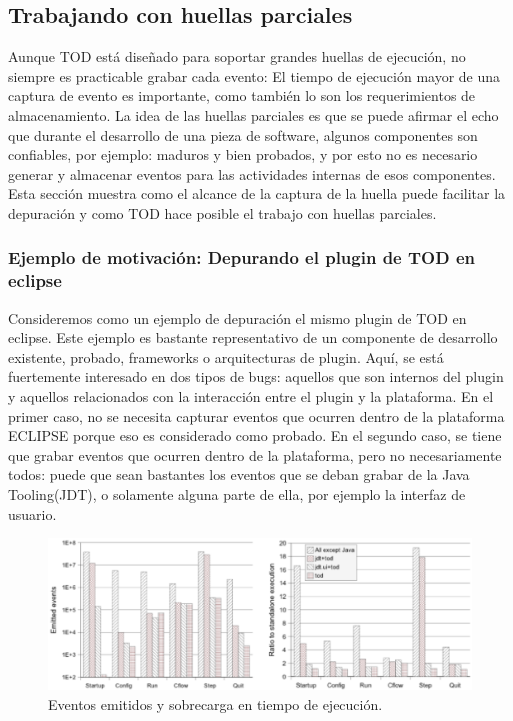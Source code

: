 \documentclass[12pt,legalpaper]{report}
\begin{document}
		\subsection{Trabajando con huellas parciales}

	Aunque TOD está diseñado para soportar grandes huellas de ejecución, no siempre es practicable grabar cada evento:  El tiempo de ejecución mayor de una captura de evento es importante, como también lo son los requerimientos de almacenamiento.  La idea de las huellas parciales es que se puede afirmar el echo que durante el desarrollo de una pieza de software, algunos componentes son confiables, por ejemplo: maduros y bien probados, y por esto no es necesario generar y almacenar eventos para las actividades internas de esos componentes.  Esta sección muestra como el alcance de la captura de la huella puede facilitar la depuración y como TOD hace posible el trabajo con huellas parciales.

			\subsubsection[Ejemplo de motivación]{Ejemplo de motivación: Depurando el plugin de TOD en eclipse}

Consideremos como un ejemplo de depuración el mismo plugin de TOD en eclipse.  Este ejemplo es bastante representativo de un componente de desarrollo existente, probado, frameworks o arquitecturas de plugin.  Aquí, se está fuertemente interesado en dos tipos de bugs:  aquellos que son internos del plugin y aquellos relacionados con la interacción entre el plugin y la plataforma.  En el primer caso, no se necesita capturar eventos que ocurren dentro de la plataforma ECLIPSE porque eso es considerado como probado.  En el segundo caso, se tiene que grabar eventos que ocurren dentro de la plataforma, pero no necesariamente todos:  puede que sean bastantes los eventos que se deban grabar de la Java Tooling(JDT), o solamente alguna parte de ella, por ejemplo la interfaz de usuario.

\begin{figure}[h]
	\centering
	\includegraphics[scale=0.6]{images/TOD/RuntimeOverhead.eps}
	\caption{Eventos emitidos y sobrecarga en tiempo de ejecución.}
	\label{RuntimeOverhead}
\end{figure}
\end{document}
